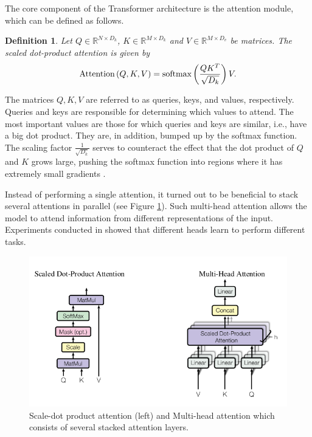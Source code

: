 \documentclass[en]{pracamgr}
\newtheorem{defi}{Definition}[section]
\begin{document}
The core component of the Transformer architecture is the attention module, which can be defined as follows.

\begin{defi}\label{attention_def}
    Let $Q \in \mathbb{R}^{N\times D_k}$, $K \in \mathbb{R}^{M\times D_k}$ and $V \in \mathbb{R}^{M\times D_v}$ be matrices. The scaled dot-product attention is given by
        \begin{equation*}
        \normalfont
        \textrm{Attention} \left( Q, K, V \right) = \textrm{softmax}\left(\frac{QK^T}{\sqrt{D_k}} \right) V.
    \end{equation*}

\end{defi}

The matrices $Q, K, V$ are referred to as queries, keys, and values, respectively. Queries and keys are responsible for determining which values to attend. The most important values are those for which queries and keys are similar, i.e., have a big dot product. They are, in addition, bumped up by the softmax function. The scaling factor $\frac{1}{\sqrt{D_k}}$ serves to counteract the effect that the dot product of $Q$ and $K$ grows large, pushing the softmax function into regions where it has extremely small gradients \cite{DBLP:conf/nips/VaswaniSPUJGKP17}.

Instead of performing a single attention, it turned out to be beneficial to stack several attentions in parallel (see Figure \ref{multi-head}). Such multi-head attention allows the model to attend information from different representations of the input. Experiments conducted in \cite{DBLP:conf/nips/VaswaniSPUJGKP17} showed that different heads learn to perform different tasks.

\begin{figure}[H]
\centering
\includegraphics[scale=0.7]{images/attention_module.png}
\caption{Scale-dot product attention (left) and Multi-head attention which consists of several stacked attention layers.}
\label{multi-head}
\end{figure}
\end{document}
